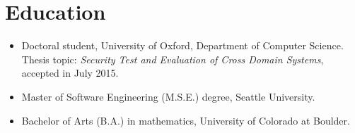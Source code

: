 \section*{Education}
\vspace{-2mm}

\begin{itemize}
	\item Doctoral student, University of Oxford, Department of
		Computer Science. Thesis topic: \emph{Security Test and
		Evaluation of Cross Domain Systems}, accepted in July 2015.\vspace{-1mm}
	\item Master of Software Engineering (M.S.E.) degree, Seattle University.\vspace{-1mm}
	\item Bachelor of Arts (B.A.) in mathematics, University of Colorado at Boulder.
\end{itemize}

